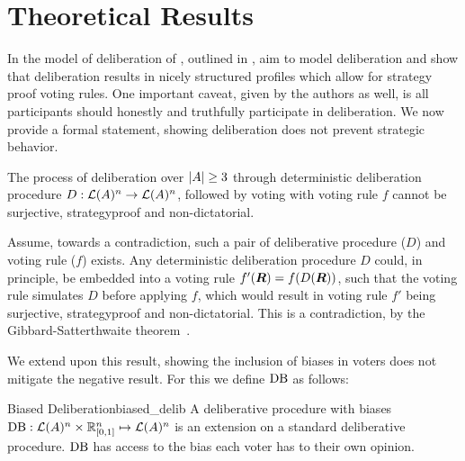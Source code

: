 \newpage
\chapter{Theoretical Results}
\label{theory}


In the model of deliberation of \citet{radDeliberationSinglePeakednessCoherent2021a}, outlined in , aim to model deliberation and show that deliberation results in nicely structured profiles which allow for strategy proof voting rules. One important caveat, given by the authors as well, is all participants should honestly and truthfully participate in deliberation. We now provide a formal statement, showing deliberation does not prevent strategic behavior.

\begin{proposition}
	The process of deliberation over $|A| \geq 3$ through deterministic deliberation procedure \({D}: \mathcal{L}(A)^n \to \mathcal{L}(A)^n\), followed by voting with voting rule $f$ cannot be surjective, strategyproof and non-dictatorial.

	\label{proposition:deterministic-delib}
\end{proposition}

\begin{proofc}
	Assume, towards a contradiction, such a pair of deliberative procedure ($D$) and voting rule (\(f\)) exists. Any deterministic deliberation procedure $D$ could, in principle, be embedded into a voting rule $f'(\boldsymbol{R}) = f(D(\boldsymbol{R}))$, such that the voting rule simulates $D$ before applying $f$, which would result in  voting rule $f'$ being surjective, strategyproof and non-dictatorial. This is a contradiction, by the Gibbard-Satterthwaite theorem~\citep{gibbardManipulationVotingSchemes1973,satterthwaiteStrategyproofnessArrowsConditions1975}.
\end{proofc}


We extend upon this result, showing the inclusion of biases in voters does not mitigate the negative result. For this we define $\operatorname{DB}$ as follows:

\begin{definition}{Biased Deliberation}{biased_delib}
	A deliberative procedure with biases $\operatorname{DB} : \mathcal{L}(A) ^ n \times \mathbb{R}_{[0,1]}^n \mapsto \mathcal{L}(A)^n$ is an extension on a standard deliberative procedure. \(\operatorname{DB}\) has access to the bias each voter has to their own opinion.
\end{definition}

